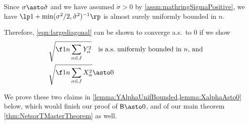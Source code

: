 \documentclass[main.tex]{subfiles}
\begin{document}
Since $\sigma \asto \mathring \sigma$ and we have assumed $\mathring \sigma > 0$ by \cref{assm:mathringSigmaPositive}, we have $\lp 1 + \min(\sigma^2/2, \mathring \sigma^2)^{-1} \rp$ is almost surely uniformly bounded in $n$.

Therefore, \cref{eqn:largediagonal} can be shown to converge a.s.\ to 0 if we show
\begin{align*}
&\sqrt{\f 1 n \sum_{\alpha \in \JJc} Y_\alpha^2} \quad\text{is a.s.\ uniformly bounded in $n$, and}\\
&\sqrt{\f 1 n \sum_{\alpha \in \JJc} X_\alpha^2} \asto 0
\end{align*}

We prove these two claims in \cref{lemma:YAlphaUnifBounded,lemma:XalphaAsto0} below, which would finish our proof of $\probB \asto 0$, and of our main theorem \cref{thm:NetsorTMasterTheorem} as well.
\end{document}
